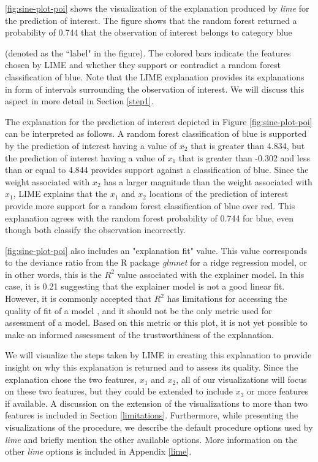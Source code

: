 \documentclass[AMS,STIX2COL]{WileyNJD-v2}\usepackage[]{graphicx}\usepackage[]{color}
\begin{document}
\autoref{fig:sine-plot-poi} shows the visualization of the explanation produced by \emph{lime} for the prediction of interest. The figure shows that the random forest returned a probability of 0.744 that the observation of interest belongs to category blue {(denoted as the ``label" in the figure). The colored bars indicate the features chosen by LIME and whether they support or contradict a random forest classification of blue. Note that the LIME explanation provides its explanations in form of intervals surrounding the observation of interest. We will discuss this aspect in more detail in Section \ref{step1}. 

The explanation for the prediction of interest depicted in Figure \ref{fig:sine-plot-poi} can be interpreted as follows. A random forest classification of blue is supported by the prediction of interest having a value of $x_2$ that is greater than 4.834, but the prediction of interest having a value of $x_1$ that is greater than -0.302 and less than or equal to 4.844 provides support against a classification of blue. Since the weight associated with $x_2$ has a larger magnitude than the weight associated with $x_1$, LIME explains that the $x_1$ and $x_2$ locations of the prediction of interest provide more support for a random forest classification of blue over red. This explanation agrees with the random forest probability of 0.744 for blue, even though both classify the observation incorrectly.

\autoref{fig:sine-plot-poi} also includes an "explanation fit" value. This value corresponds to the deviance ratio from the R package \emph{glmnet} \citep{simon:2011} for a ridge regression model, or in other words, this is the $R^2$ value associated with the explainer model. In this case, it is 0.21 suggesting that the explainer model is not a good linear fit. However, it is commonly accepted that $R^2$ has limitations for accessing the quality of fit of a model \citep{sapra:2014}, and it should not be the only metric used for assessment of a model. Based on this metric or this plot, it is not yet possible to make an informed assessment of the trustworthiness of the explanation.

We will visualize the steps taken by LIME in creating this explanation to provide insight on why this explanation is returned and to assess its quality. Since the explanation chose the two features, $x_1$ and $x_2$, all of our visualizations will focus on these two features, but they could be extended to include $x_3$ or more features if available. A discussion on the extension of the visualizations to more than two features is included in Section \ref{limitations}. Furthermore, while presenting the visualizations of the procedure, we describe the default procedure options used by \emph{lime} and briefly mention the other available options. More information on the other \emph{lime} options is included in Appendix \ref{lime}.

}
\end{document}
